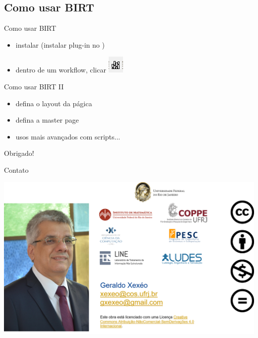 \documentclass{beamer}
\begin{document}
\subsection{Como usar BIRT}
\begin{frame}{Como usar BIRT}
    \begin{itemize}
        \item instalar (instalar plug-in no )
        \item dentro de um workflow, clicar \includegraphics{Images/birticon.png}
    \end{itemize}
\end{frame}

\begin{frame}{Como usar BIRT II}
    \begin{itemize}
        \item defina o layout da págica
        \item defina a master page
        \item usos mais avançados com scripts...
    \end{itemize}
\end{frame}

\begin{frame}
    \Huge \center
    Obrigado!
\end{frame} 


\begin{frame}{Contato}
    \begin{center}
        \includegraphics[width=\linewidth]{Images/Picture5.png}
    \end{center}   
\end{frame}
\end{document}
